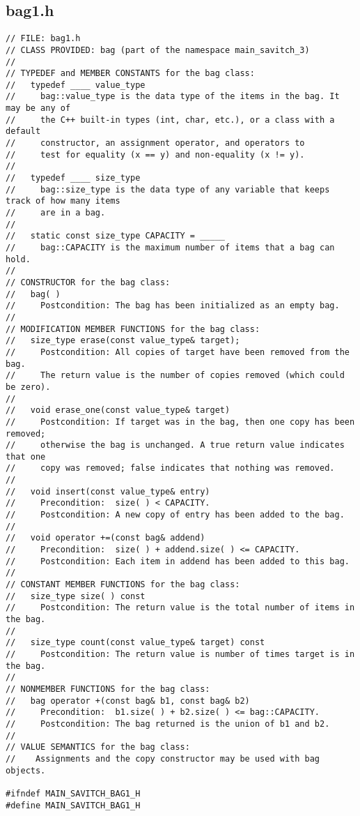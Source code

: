 \documentclass[11pt]{article}
\begin{document}
\subsection*{bag1.h}
\begin{lstlisting}
// FILE: bag1.h
// CLASS PROVIDED: bag (part of the namespace main_savitch_3)
//
// TYPEDEF and MEMBER CONSTANTS for the bag class:
//   typedef ____ value_type
//     bag::value_type is the data type of the items in the bag. It may be any of
//     the C++ built-in types (int, char, etc.), or a class with a default
//     constructor, an assignment operator, and operators to
//     test for equality (x == y) and non-equality (x != y).
//
//   typedef ____ size_type
//     bag::size_type is the data type of any variable that keeps track of how many items
//     are in a bag.
//
//   static const size_type CAPACITY = _____
//     bag::CAPACITY is the maximum number of items that a bag can hold.
//
// CONSTRUCTOR for the bag class:
//   bag( )
//     Postcondition: The bag has been initialized as an empty bag.
//
// MODIFICATION MEMBER FUNCTIONS for the bag class:
//   size_type erase(const value_type& target);
//     Postcondition: All copies of target have been removed from the bag.
//     The return value is the number of copies removed (which could be zero).
//
//   void erase_one(const value_type& target)
//     Postcondition: If target was in the bag, then one copy has been removed;
//     otherwise the bag is unchanged. A true return value indicates that one
//     copy was removed; false indicates that nothing was removed.
//
//   void insert(const value_type& entry)
//     Precondition:  size( ) < CAPACITY.
//     Postcondition: A new copy of entry has been added to the bag.
//
//   void operator +=(const bag& addend)
//     Precondition:  size( ) + addend.size( ) <= CAPACITY.
//     Postcondition: Each item in addend has been added to this bag.
//
// CONSTANT MEMBER FUNCTIONS for the bag class:
//   size_type size( ) const
//     Postcondition: The return value is the total number of items in the bag.
//
//   size_type count(const value_type& target) const
//     Postcondition: The return value is number of times target is in the bag.
//
// NONMEMBER FUNCTIONS for the bag class:
//   bag operator +(const bag& b1, const bag& b2)
//     Precondition:  b1.size( ) + b2.size( ) <= bag::CAPACITY.
//     Postcondition: The bag returned is the union of b1 and b2.
//
// VALUE SEMANTICS for the bag class:
//    Assignments and the copy constructor may be used with bag objects.

#ifndef MAIN_SAVITCH_BAG1_H
#define MAIN_SAVITCH_BAG1_H


\end{lstlisting}
\end{document}
